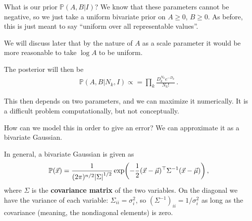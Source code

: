 \documentclass[main.tex]{subfiles}
\begin{document}
What is our prior \(\mathbb{P}(A,B | I)\)? We know that these parameters cannot be negative, so we just take a uniform bivariate prior on \(A\geq 0\),  \(B \geq 0\).
As before, this is just meant to say ``uniform over all representable values''. 

We will discuss later that by the nature of \(A\) as a scale parameter it would be more reasonable to take \(\log A\) to be uniform.

The posterior will then be 
%
\begin{align}
\mathbb{P}(A, B | N_k, I) \propto
= \prod_k \frac{D_k^{N_k} e^{-D_k}}{N_k!}
\,.
\end{align}

This then depends on two parameters, and we can maximize it numerically. It is a difficult problem computationally, but not conceptually. 

How can we model this in order to give an error? We can approximate it as a bivariate Gaussian. 

In general, a bivariate Gaussian is given as 
%
\begin{align}
\mathbb{P}(\vec{x}) = \frac{1}{(2 \pi )^{n/2} \abs{\Sigma }^{1/2}}
\exp(- \frac{1}{2} (\vec{x} - \vec{\mu})^{\top} \Sigma^{-1} (\vec{x} - \vec{\mu}))
\,,
\end{align}
%
where \(\Sigma \) is the \textbf{covariance matrix} of the two variables. 
On the diagonal we have the variance of each variable: \(\Sigma_{ii} = \sigma_i^2\), so \((\Sigma^{-1})_{ii} = 1 / \sigma _i^2\) as long as the covariance (meaning, the nondiagonal elements) is zero.
\end{document}
